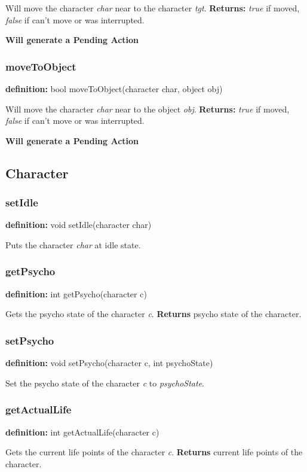 \documentclass[ letterpaper,12pt]{article}
\begin{document}
Will move the character {\it char} near to the character {\it tgt}. {\bf Returns:} 
{\it true} if moved, {\it false} if can't move or was interrupted.

{\bf Will generate a Pending Action}

\subsubsection{moveToObject}
{\bf definition:} bool moveToObject(character char, object obj)

Will move the character {\it char} near to the object {\it obj}. {\bf Returns:} 
{\it true} if moved, {\it false} if can't move or was interrupted.

{\bf Will generate a Pending Action}

\subsection{Character}

\subsubsection{setIdle}
{\bf definition:} void setIdle(character char)

Puts the character {\it char} at idle state.

\subsubsection{getPsycho}
{\bf definition:} int getPsycho(character c)

Gets the psycho state of the character {\it c}. {\bf Returns} psycho state of
the character.

\subsubsection{setPsycho}
{\bf definition:} void setPsycho(character c, int psychoState)

Set the psycho state of the character {\it c} to {\it psychoState}.

\subsubsection{getActualLife}
{\bf definition:} int getActualLife(character c)

Gets the current life points of the character {\it c}. {\bf Returns} current
life points of the character.
\end{document}
